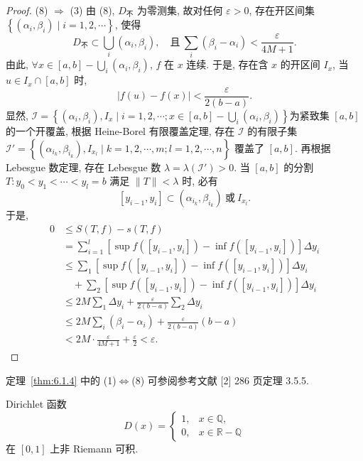 \begin{proof}
(8) $\Rightarrow$ (3) 由 (8), $D_{\text{不}}$ 为零测集, 故对任何 $\varepsilon>0$, 存在开区间集 $\left\{(\alpha_{i},\beta_{i})\mid i=1,2,\cdots\right\}$, 使得
\[
D_{\text{不}}\subset\bigcup_{i}(\alpha_{i},\beta_{i}),\quad\text{且}\ \sum_{i}(\beta_{i}-\alpha_{i})<\frac{\varepsilon}{4M+1}.
\]
由此, $\forall x\in[a,b]-\bigcup_{i}(\alpha_{i},\beta_{i})$, $f$ 在 $x$ 连续. 于是, 存在含 $x$ 的开区间 $I_{x}$, 当 $u\in I_{x}\cap[a,b]$ 时,
\[
|f(u)-f(x)|<\frac{\varepsilon}{2(b-a)}.
\]
显然, $\mathcal{I}=\left\{(\alpha_{i},\beta_{i}),I_{x}\mid i=1,2,\cdots;x\in[a,b]-\bigcup_{i}(\alpha_{i},\beta_{i})\right\}$\linebreak[4]为紧致集 $[a,b]$ 的一个开覆盖, 根据 Heine-Borel 有限覆盖定理, 存在 $\mathcal{I}$ 的有限子集 $\mathcal{I}'=\left\{(\alpha_{i_{k}},\beta_{i_{k}}),\allowbreak I_{x_{l}}\mid k=1,2,\cdots,m;l=1,2,\cdots,n\right\}$ 覆盖了 $[a,b]$. 再根据 Lebesgue 数定理, 存在 Lebesgue 数 $\lambda=\lambda(\mathcal{I}')>0$. 当 $[a,b]$ 的分割 $T:y_{0}<y_{1}<\cdots<y_{l}=b$ 满足 $\|T\|<\lambda$ 时, 必有
\[
[y_{i-1},y_{i}]\subset(\alpha_{i_{k}},\beta_{i_{k}})\ \text{或}\ I_{x_{l}}.
\]
于是,
\begin{align*}
0&\leqslant S(T,f)-s(T,f)\\
&=\sum_{i=1}^{l}\left[\sup f([y_{i-1},y_{i}])-\inf f([y_{i-1},y_{i}])\right]\Delta y_{i}\\
&\leqslant\sum_{1}\left[\sup f([y_{i-1},y_{i}])-\inf f([y_{i-1},y_{i}])\right]\Delta y_{i}\\
&\quad+\sum_{2}\left[\sup f([y_{i-1},y_{i}])-\inf f([y_{i-1},y_{i}])\right]\Delta y_{i}\\
&\leqslant 2M\sum_{1}\Delta y_{i}+\frac{\varepsilon}{2(b-a)}\sum_{2}\Delta y_{i}\\
&\leqslant 2M\sum_{i}(\beta_{i}-\alpha_{i})+\frac{\varepsilon}{2(b-a)}(b-a)\\
&<2M\cdot\frac{\varepsilon}{4M+1}+\frac{\varepsilon}{2}<\varepsilon.
\end{align*}
\end{proof}

\begin{remark}\label{remark:6.1.1}
定理~\ref{thm:6.1.4} 中的 (1)$\Leftrightarrow$(8) 可参阅参考文献 [2] 286 页定理 3.5.5.
\end{remark}

\begin{example}\label{ex:6.1.1}
Dirichlet 函数
\[
D(x)=\begin{cases}1,&x\in\mathbb{Q},\\0,&x\in\mathbb{R}-\mathbb{Q}\end{cases}
\]
在 $[0,1]$ 上非 Riemann 可积.
\end{example}

